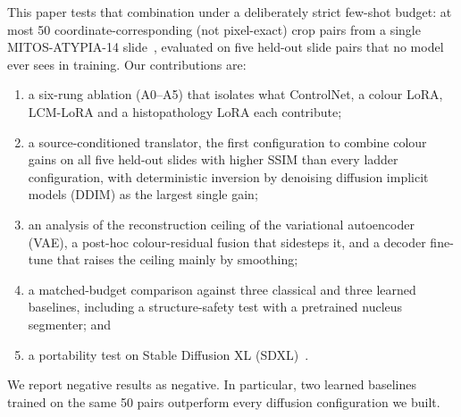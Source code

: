 This paper tests that combination under a deliberately strict few-shot budget: at most 50
coordinate-corresponding (not pixel-exact) crop pairs from a single MITOS-ATYPIA-14
slide~\cite{roux2014mitos}, evaluated on five held-out slide pairs that no model ever sees in training.
Our contributions are:
\begin{enumerate}
\item a six-rung ablation (A0--A5) that isolates what ControlNet, a colour LoRA, LCM-LoRA and a
histopathology LoRA each contribute;
\item a source-conditioned translator, the first configuration to combine colour gains on all five held-out
slides with higher SSIM than every ladder configuration, with deterministic inversion by denoising
diffusion implicit models (DDIM) as the largest single gain;
\item an analysis of the reconstruction ceiling of the variational autoencoder (VAE), a post-hoc colour-residual fusion that sidesteps it,
and a decoder fine-tune that raises the ceiling mainly by smoothing;
\item a matched-budget comparison against three classical and three learned baselines, including a
structure-safety test with a pretrained nucleus segmenter; and
\item a portability test on Stable Diffusion XL (SDXL)~\cite{podell2023sdxl}.
\end{enumerate}
We report negative results as negative. In particular, two learned baselines trained on the same 50 pairs
outperform every diffusion configuration we built.
